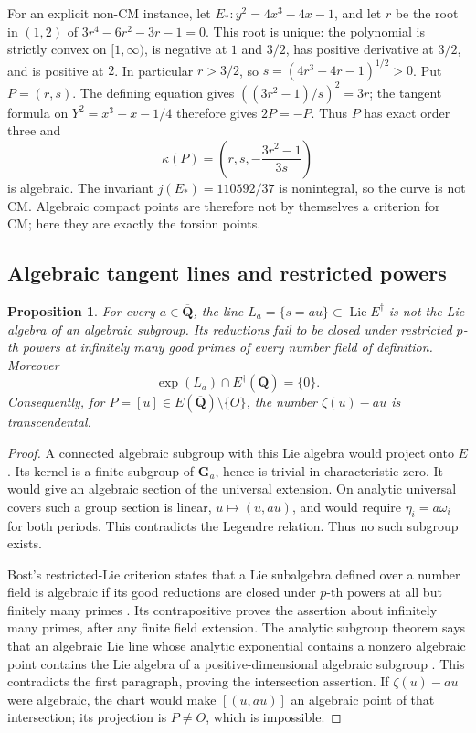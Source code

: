 \documentclass[11pt]{article}
\newtheorem{proposition}[theorem]{Proposition}
\theoremstyle{definition}\newtheorem{definition}[theorem]{Definition}
\theoremstyle{remark}\newtheorem{remark}[theorem]{Remark}
\newcommand{\Qb}{\overline{\mathbf Q}}\newcommand{\Fp}{\mathbf F_p}
\DeclareMathOperator{\Lie}{Lie}\DeclareMathOperator{\trdeg}{trdeg}
\begin{document}
For an explicit non-CM instance, let $E_*:y^2=4x^3-4x-1$, and let $r$ be the root in $(1,2)$ of
$3r^4-6r^2-3r-1=0$. This root is unique: the polynomial is strictly convex on $[1,\infty)$, is negative at $1$ and $3/2$, has positive derivative at $3/2$, and is positive at $2$. In particular $r>3/2$, so $s=(4r^3-4r-1)^{1/2}>0$. Put $P=(r,s)$. The defining equation gives
$((3r^2-1)/s)^2=3r$; the tangent formula on $Y^2=x^3-x-1/4$ therefore gives $2P=-P$. Thus $P$ has exact order three and
\[
       \kappa(P)=\left(r,s,-\frac{3r^2-1}{3s}\right)
\]
is algebraic. The invariant $j(E_*)=110592/37$ is nonintegral, so the curve is not CM. Algebraic compact points are therefore not by themselves a criterion for CM; here they are exactly the torsion points.

\subsection{Algebraic tangent lines and restricted powers}
\begin{proposition}\label{prop:no-algebraic-splitting-line}
For every $a\in\Qb$, the line $L_a=\{s=au\}\subset\Lie E^\dagger$ is not the Lie algebra of an algebraic subgroup. Its reductions fail to be closed under restricted $p$-th powers at infinitely many good primes of every number field of definition. Moreover
\[
             \exp(L_a)\cap E^\dagger(\Qb)=\{0\}.
\]
Consequently, for $P=[u]\in E(\Qb)\setminus\{O\}$, the number $\zeta(u)-au$ is transcendental.
\end{proposition}
\begin{proof}
A connected algebraic subgroup with this Lie algebra would project onto $E$. Its kernel is a finite subgroup of $\mathbf G_a$, hence is trivial in characteristic zero. It would give an algebraic section of the universal extension. On analytic universal covers such a group section is linear, $u\mapsto(u,au)$, and would require $\eta_i=a\omega_i$ for both periods. This contradicts the Legendre relation. Thus no such subgroup exists.

Bost's restricted-Lie criterion states that a Lie subalgebra defined over a number field is algebraic if its good reductions are closed under $p$-th powers at all but finitely many primes \cite[Theorem 2.3, p.~172]{BostLeaves}. Its contrapositive proves the assertion about infinitely many primes, after any finite field extension. The analytic subgroup theorem says that an algebraic Lie line whose analytic exponential contains a nonzero algebraic point contains the Lie algebra of a positive-dimensional algebraic subgroup \cite[Hauptsatz, p.~3]{WustholzAnalytic}. This contradicts the first paragraph, proving the intersection assertion. If $\zeta(u)-au$ were algebraic, the chart would make $[(u,au)]$ an algebraic point of that intersection; its projection is $P\ne O$, which is impossible.
\end{proof}
\end{document}
